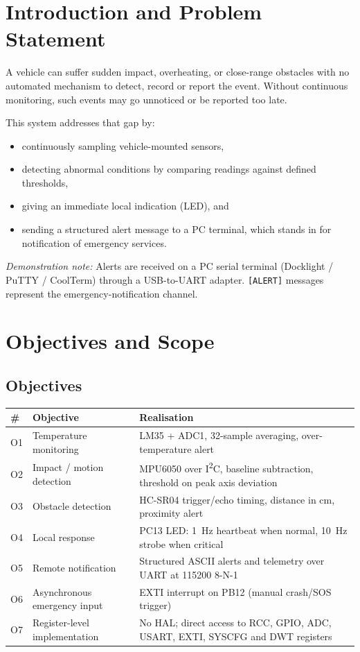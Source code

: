 \documentclass[11pt,a4paper]{article}
\begin{document}
\section{Introduction and Problem Statement}
A vehicle can suffer sudden impact, overheating, or close-range obstacles with no automated mechanism to detect, record or report the event. Without continuous monitoring, such events may go unnoticed or be reported too late.

This system addresses that gap by:
\begin{itemize}
  \item continuously sampling vehicle-mounted sensors,
  \item detecting abnormal conditions by comparing readings against defined thresholds,
  \item giving an immediate local indication (LED), and
  \item sending a structured alert message to a PC terminal, which stands in for notification of emergency services.
\end{itemize}

\textit{Demonstration note:} Alerts are received on a PC serial terminal (Docklight / PuTTY / CoolTerm) through a USB-to-UART adapter. \texttt{[ALERT]} messages represent the emergency-notification channel.

\section{Objectives and Scope}
\subsection{Objectives}
\begin{tabularx}{\textwidth}{@{}l L{3.6cm} X@{}}
\toprule
\textbf{\#} & \textbf{Objective} & \textbf{Realisation}\\
\midrule
O1 & Temperature monitoring & LM35 + ADC1, 32-sample averaging, over-temperature alert\\
O2 & Impact / motion detection & MPU6050 over I\textsuperscript{2}C, baseline subtraction, threshold on peak axis deviation\\
O3 & Obstacle detection & HC-SR04 trigger/echo timing, distance in cm, proximity alert\\
O4 & Local response & PC13 LED: 1~Hz heartbeat when normal, 10~Hz strobe when critical\\
O5 & Remote notification & Structured ASCII alerts and telemetry over UART at 115200 8-N-1\\
O6 & Asynchronous emergency input & EXTI interrupt on PB12 (manual crash/SOS trigger)\\
O7 & Register-level implementation & No HAL; direct access to RCC, GPIO, ADC, USART, EXTI, SYSCFG and DWT registers\\
\bottomrule
\end{tabularx}
\end{document}
